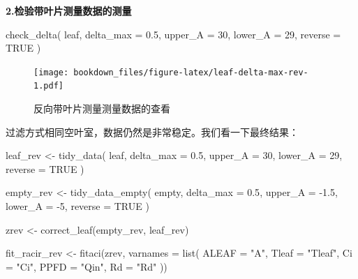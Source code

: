 \documentclass[
]{krantz}
\makeatletter
\newenvironment{Shaded}{\begin{snugshade}}{\end{snugshade}}
\newcommand{\AttributeTok}[1]{\textcolor[rgb]{0.77,0.63,0.00}{#1}}
\newcommand{\ConstantTok}[1]{\textcolor[rgb]{0.00,0.00,0.00}{#1}}
\newcommand{\DecValTok}[1]{\textcolor[rgb]{0.00,0.00,0.81}{#1}}
\newcommand{\FloatTok}[1]{\textcolor[rgb]{0.00,0.00,0.81}{#1}}
\newcommand{\FunctionTok}[1]{\textcolor[rgb]{0.00,0.00,0.00}{#1}}
\newcommand{\NormalTok}[1]{#1}
\newcommand{\OtherTok}[1]{\textcolor[rgb]{0.56,0.35,0.01}{#1}}
\newcommand{\SpecialCharTok}[1]{\textcolor[rgb]{0.00,0.00,0.00}{#1}}
\newcommand{\StringTok}[1]{\textcolor[rgb]{0.31,0.60,0.02}{#1}}
\newenvironment{kframe}{%
\medskip{}
\setlength{\fboxsep}{.8em}
 \def\at@end@of@kframe{}%
 \ifinner\ifhmode%
  \def\at@end@of@kframe{\end{minipage}}%
  \begin{minipage}{\columnwidth}%
 \fi\fi%
 \def\FrameCommand##1{\hskip\@totalleftmargin \hskip-\fboxsep
 \colorbox{shadecolor}{##1}\hskip-\fboxsep
     \hskip-\linewidth \hskip-\@totalleftmargin \hskip\columnwidth}%
 \MakeFramed {\advance\hsize-\width
   \@totalleftmargin\z@ \linewidth\hsize
   \@setminipage}}%
 {\par\unskip\endMakeFramed%
 \at@end@of@kframe}
\renewenvironment{Shaded}{\begin{kframe}}{\end{kframe}}
\makeatother
\begin{document}
\textbf{2.检验带叶片测量数据的测量}

\begin{Shaded}
\begin{Highlighting}[]
\FunctionTok{check\_delta}\NormalTok{(}
\NormalTok{  leaf,}
  \AttributeTok{delta\_max =} \FloatTok{0.5}\NormalTok{,}
  \AttributeTok{upper\_A =} \DecValTok{30}\NormalTok{,}
  \AttributeTok{lower\_A =} \DecValTok{29}\NormalTok{,}
  \AttributeTok{reverse =} \ConstantTok{TRUE}
\NormalTok{)}
\end{Highlighting}
\end{Shaded}

\begin{figure}
\centering
\texttt{[image: bookdown\_files/figure-latex/leaf-delta-max-rev-1.pdf]}
\caption{\label{fig:leaf-delta-max-rev}反向带叶片测量测量数据的查看}
\end{figure}

过滤方式相同空叶室，数据仍然是非常稳定。我们看一下最终结果：

\begin{Shaded}
\begin{Highlighting}[]
\NormalTok{leaf\_rev }\OtherTok{\textless{}{-}} \FunctionTok{tidy\_data}\NormalTok{(}
\NormalTok{  leaf,}
  \AttributeTok{delta\_max =} \FloatTok{0.5}\NormalTok{,}
  \AttributeTok{upper\_A =} \DecValTok{30}\NormalTok{,}
  \AttributeTok{lower\_A =} \DecValTok{29}\NormalTok{,}
  \AttributeTok{reverse =} \ConstantTok{TRUE}
\NormalTok{)}

\NormalTok{empty\_rev }\OtherTok{\textless{}{-}} \FunctionTok{tidy\_data\_empty}\NormalTok{(}
\NormalTok{  empty,}
  \AttributeTok{delta\_max =} \FloatTok{0.5}\NormalTok{,}
  \AttributeTok{upper\_A =} \SpecialCharTok{{-}}\FloatTok{1.5}\NormalTok{,}
  \AttributeTok{lower\_A =} \SpecialCharTok{{-}}\DecValTok{5}\NormalTok{,}
  \AttributeTok{reverse =} \ConstantTok{TRUE}
\NormalTok{)}

\NormalTok{zrev }\OtherTok{\textless{}{-}} \FunctionTok{correct\_leaf}\NormalTok{(empty\_rev, leaf\_rev)}

\NormalTok{fit\_racir\_rev }\OtherTok{\textless{}{-}} \FunctionTok{fitaci}\NormalTok{(zrev,}
               \AttributeTok{varnames =}
                 \FunctionTok{list}\NormalTok{(}
                   \AttributeTok{ALEAF =} \StringTok{"A"}\NormalTok{,}
                   \AttributeTok{Tleaf =} \StringTok{"Tleaf"}\NormalTok{,}
                   \AttributeTok{Ci =} \StringTok{"Ci"}\NormalTok{,}
                   \AttributeTok{PPFD  =} \StringTok{"Qin"}\NormalTok{,}
                   \AttributeTok{Rd =} \StringTok{"Rd"}
\NormalTok{                ))}
\end{Highlighting}
\end{Shaded}
\end{document}
